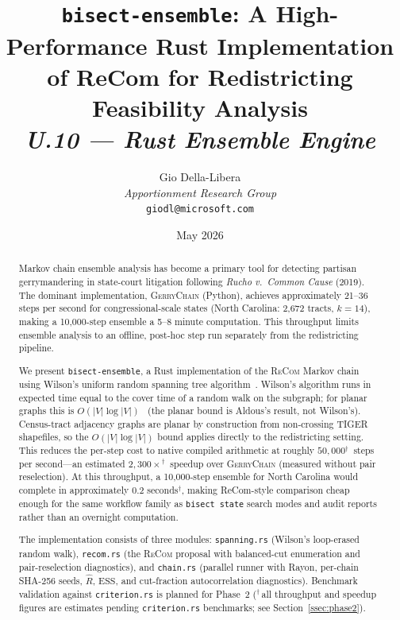 \documentclass[12pt]{article}
\title{%
  \textbf{\texttt{bisect-ensemble}: A High-Performance Rust Implementation}\\
  \textbf{of ReCom for Redistricting Feasibility Analysis}\\[0.8em]
  \normalsize\textit{U.10 --- Rust Ensemble Engine}%
}
\author{%
  Gio Della-Libera\\
  \textit{Apportionment Research Group}\\
  \small\texttt{giodl@microsoft.com}
}
\date{May 2026}
\newcommand{\gc}{\textsc{GerryChain}}
\newcommand{\recom}{\textsc{ReCom}}
\newcommand{\rhat}{\ensuremath{\hat{R}}}
\newcommand{\ess}{\mathrm{ESS}}
\newcommand{\est}{$^{\dagger}$}
\begin{document}
\maketitle

\begin{abstract}
\noindent
Markov chain ensemble analysis has become a primary tool for detecting
partisan gerrymandering in state-court litigation following
\textit{Rucho v.\ Common Cause} (2019).
The dominant implementation, \gc{} (Python), achieves approximately
21--36 steps per second for congressional-scale states
(North Carolina: 2{,}672 tracts, $k=14$), making a 10{,}000-step
ensemble a 5--8 minute computation.
This throughput limits ensemble analysis to an offline, post-hoc step
run separately from the redistricting pipeline.

We present \texttt{bisect-ensemble}, a Rust implementation of the
\recom{} Markov chain using Wilson's uniform random spanning tree
algorithm~\citep{wilson1996generating}.
Wilson's algorithm runs in expected time equal to the cover time of
a random walk on the subgraph; for planar graphs this is
$O(|V|\log|V|)$~\citep{aldous1991random} (the planar bound is
Aldous's result, not Wilson's).
Census-tract adjacency graphs are planar by construction from
non-crossing TIGER shapefiles, so the $O(|V|\log|V|)$ bound applies
directly to the redistricting setting.
This reduces the per-step cost to native
compiled arithmetic at roughly $50{,}000$\est\ steps per
second---an estimated $2{,}300\times$\est\ speedup over \gc{}
(measured without pair reselection).
At this throughput, a 10{,}000-step ensemble for North Carolina would
complete in approximately 0.2 seconds\est, making ReCom-style comparison
cheap enough for the same workflow family as \texttt{bisect state}
search modes and audit reports rather than an overnight computation.

The implementation consists of three modules: \texttt{spanning.rs}
(Wilson's loop-erased random walk), \texttt{recom.rs} (the \recom{}
proposal with balanced-cut enumeration and pair-reselection diagnostics),
and \texttt{chain.rs} (parallel runner with Rayon, per-chain SHA-256
seeds, $\rhat$, $\ess$, and cut-fraction autocorrelation diagnostics).
Benchmark validation against \texttt{criterion.rs} is planned for Phase~2
(\est\,all throughput and speedup figures are estimates pending
\texttt{criterion.rs} benchmarks; see Section~\ref{ssec:phase2}).
\end{abstract}

\tableofcontents
\newpage











\end{document}
